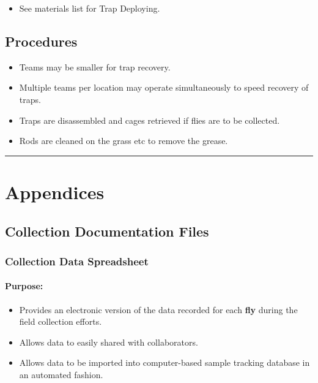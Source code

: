 \documentclass[letterpaper]{scrreprt}
\begin{document}
\begin{itemize}
\itemsep1pt\parskip0pt
\item
  See materials list for Trap Deploying.
\end{itemize}

\section{Procedures}\label{procedures-3}

\begin{itemize}
\itemsep1pt\parskip0pt
\item
  Teams may be smaller for trap recovery.
\item
  Multiple teams per location may operate simultaneously to speed
  recovery of traps.
\item
  Traps are disassembled and cages retrieved if flies are to be
  collected.
\item
  Rods are cleaned on the grass etc to remove the grease.
\end{itemize}

\begin{center}\rule{0.5\linewidth}{\linethickness}\end{center}

\chapter{Appendices}\label{appendices}

\section{Collection Documentation
Files}\label{collection-documentation-files}

\subsection{Collection Data
Spreadsheet}\label{collection-data-spreadsheet}

\subsubsection{Purpose:}\label{purpose}

\begin{itemize}
\itemsep1pt\parskip0pt
\item
  Provides an electronic version of the data recorded for each
  \textbf{fly} during the field collection efforts.
\item
  Allows data to easily shared with collaborators.
\item
  Allows data to be imported into computer-based sample tracking
  database in an automated fashion.
\end{itemize}
\end{document}
